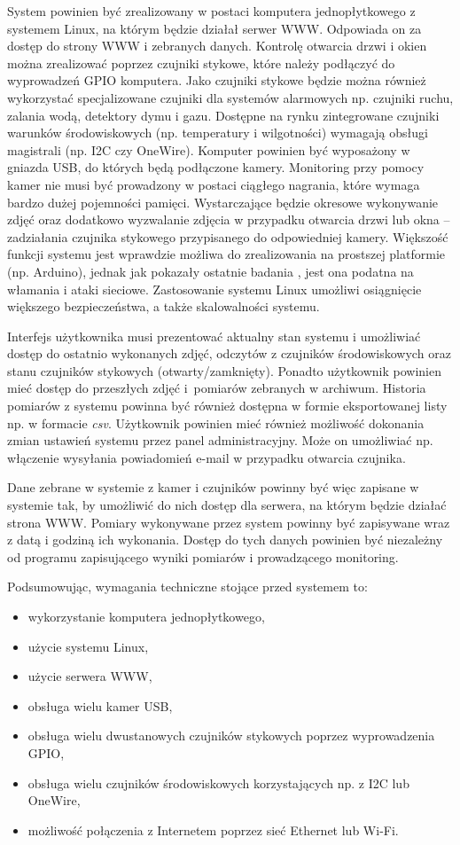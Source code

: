 \documentclass[a4paper,11pt,twoside]{article}
\begin{document}
System powinien być zrealizowany w postaci komputera jednopłytkowego z systemem Linux, na którym będzie działał serwer WWW. Odpowiada on za dostęp do strony WWW i zebranych danych. Kontrolę otwarcia drzwi i okien można zrealizować poprzez czujniki stykowe, które należy podłączyć do wyprowadzeń GPIO komputera. Jako czujniki stykowe będzie można również wykorzystać specjalizowane czujniki dla systemów alarmowych np. czujniki ruchu, zalania wodą, detektory dymu i gazu. Dostępne na rynku zintegrowane czujniki warunków środowiskowych (np. temperatury i wilgotności) wymagają obsługi magistrali (np. I2C czy OneWire). Komputer powinien być wyposażony w gniazda USB, do których będą podłączone kamery. Monitoring przy pomocy kamer nie musi być prowadzony w postaci ciągłego nagrania, które wymaga bardzo dużej pojemności pamięci. Wystarczające będzie okresowe wykonywanie zdjęć oraz dodatkowo wyzwalanie zdjęcia w przypadku otwarcia drzwi lub okna -- zadziałania czujnika stykowego przypisanego do odpowiedniej kamery. Większość funkcji systemu jest wprawdzie możliwa do zrealizowania na prostszej platformie (np. Arduino), jednak jak pokazały ostatnie badania \cite{arduino-wlamania}, jest ona podatna na włamania i ataki sieciowe. Zastosowanie systemu Linux umożliwi osiągnięcie większego bezpieczeństwa, a także skalowalności systemu. 

Interfejs użytkownika musi prezentować aktualny stan systemu i umożliwiać dostęp do ostatnio wykonanych zdjęć, odczytów z czujników środowiskowych oraz stanu czujników stykowych (otwarty/zamknięty). Ponadto użytkownik powinien mieć dostęp do przeszłych zdjęć i~pomiarów zebranych w archiwum. Historia pomiarów z systemu powinna być również dostępna w formie eksportowanej listy np. w formacie \textit{csv}. Użytkownik powinien mieć również możliwość dokonania zmian ustawień systemu przez panel administracyjny. Może on umożliwiać np. włączenie wysyłania powiadomień e-mail w przypadku otwarcia czujnika.

Dane zebrane w systemie z kamer i czujników powinny być więc zapisane w systemie tak, by umożliwić do nich dostęp dla serwera, na którym będzie działać strona WWW. Pomiary wykonywane przez system powinny być zapisywane wraz z datą i godziną ich wykonania. Dostęp do tych danych powinien być niezależny od programu zapisującego wyniki pomiarów i prowadzącego monitoring.

Podsumowując, wymagania techniczne stojące przed systemem to:
\begin{itemize}
\item wykorzystanie komputera jednopłytkowego,
\item użycie systemu Linux,
\item użycie serwera WWW,
\item obsługa wielu kamer USB,
\item obsługa wielu dwustanowych czujników stykowych poprzez wyprowadzenia GPIO,
\item obsługa wielu czujników środowiskowych korzystających np. z I2C lub OneWire,
\item możliwość połączenia z Internetem poprzez sieć Ethernet lub Wi-Fi.
\end{itemize}
\end{document}
